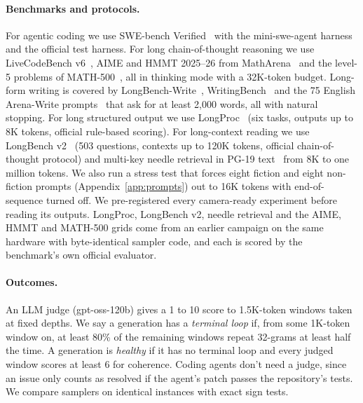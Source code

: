 \documentclass{article}
\begin{document}
\paragraph{Benchmarks and protocols.}
For agentic coding we use SWE-bench Verified~\citep{jimenez2024swebench} with the mini-swe-agent harness~\citep{minisweagent,yang2024sweagent} and the official test harness. For long chain-of-thought reasoning we use LiveCodeBench v6~\citep{jain2025livecodebench}, AIME and HMMT 2025--26 from MathArena~\citep{balunovic2025matharena} and the level-5 problems of MATH-500~\citep{lightman2024verify}, all in thinking mode with a 32K-token budget. Long-form writing is covered by LongBench-Write~\citep{bai2025longwriter}, WritingBench~\citep{wu2025writingbench} and the 75 English Arena-Write prompts~\citep{wu2026longwriterzero} that ask for at least 2,000 words, all with natural stopping. For long structured output we use LongProc~\citep{ye2025longproc} (six tasks, outputs up to 8K tokens, official rule-based scoring). For long-context reading we use LongBench v2~\citep{bai2025longbenchv2} (503 questions, contexts up to 120K tokens, official chain-of-thought protocol) and multi-key needle retrieval in PG-19 text~\citep{rae2019compressive} from 8K to one million tokens. We also run a stress test that forces eight fiction and eight non-fiction prompts (Appendix~\ref{app:prompts}) out to 16K tokens with end-of-sequence turned off. We pre-registered every camera-ready experiment before reading its outputs. LongProc, LongBench v2, needle retrieval and the AIME, HMMT and MATH-500 grids come from an earlier campaign on the same hardware with byte-identical sampler code, and each is scored by the benchmark's own official evaluator.

\paragraph{Outcomes.}
An LLM judge (gpt-oss-120b) gives a 1 to 10 score to 1.5K-token windows taken at fixed depths. We say a generation has a \emph{terminal loop} if, from some 1K-token window on, at least 80\% of the remaining windows repeat 32-grams at least half the time. A generation is \emph{healthy} if it has no terminal loop and every judged window scores at least 6 for coherence. Coding agents don't need a judge, since an issue only counts as resolved if the agent's patch passes the repository's tests. We compare samplers on identical instances with exact sign tests.

\end{document}

